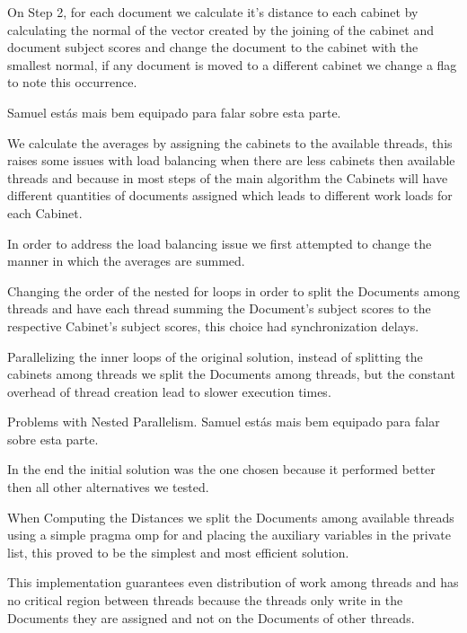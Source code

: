 \documentclass[times, 10pt,twocolumn]{article}
\begin{document}
On Step 2, for each document we calculate it's distance to each cabinet by calculating the normal of the vector created by the joining of the cabinet and document subject scores and change the document to the cabinet with the smallest normal, if any document is moved to a different cabinet we change a flag to note this occurrence.



Samuel estás mais bem equipado para falar sobre esta parte.

We calculate the averages by assigning the cabinets to the available threads, this raises some issues with load balancing when there are less cabinets then available threads and because in most steps of the main algorithm the Cabinets will have different quantities of documents assigned which leads to different work loads for each Cabinet.

In order to address the load balancing issue we first attempted to change the manner in which the averages are summed.
 
Changing the order of the nested for loops in order to split the Documents among threads and have each thread summing the Document's subject scores to the respective Cabinet's subject scores, this choice had synchronization delays.

Parallelizing the inner loops of the original solution, instead of splitting the cabinets among threads we split the Documents among threads, but the constant overhead of thread creation lead to slower execution times.

Problems with Nested Parallelism. Samuel estás mais bem equipado para falar sobre esta parte.

In the end the initial solution was the one chosen because it performed better then all other alternatives we tested.



When Computing the Distances we split the Documents among available threads using a simple pragma omp for and placing the auxiliary variables in the private list, this proved to be the simplest and most efficient solution.

This implementation guarantees even distribution of work among threads and has no critical region between threads because the threads only write in the Documents they are assigned and not on the Documents of other threads.
\end{document}
